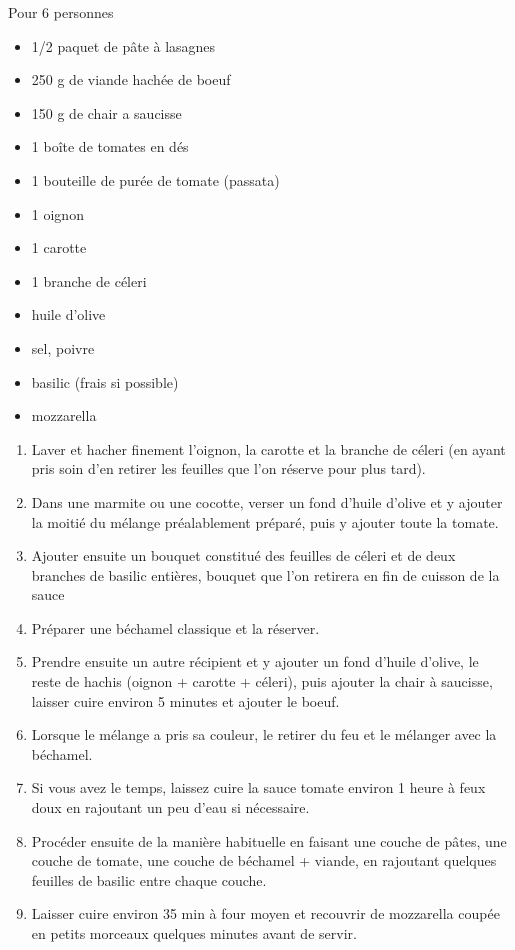 \bigskip
{}
{Pour 6 personnes}{\begin{itemize}
	\item 1/2 paquet de pâte à lasagnes
	\item 250 g de viande hachée de boeuf
	\item 150 g de chair a saucisse
	\item 1 boîte de tomates en dés
	\item 1 bouteille de purée de tomate (passata)
	\item 1 oignon
	\item 1 carotte
	\item 1 branche de céleri
	\item huile d'olive
	\item sel, poivre
	\item basilic (frais si possible)
	\item mozzarella
\end{itemize}}
{\begin{enumerate}
	\item Laver et hacher finement l'oignon, la carotte et la branche de céleri (en ayant pris soin d'en retirer les feuilles que l'on réserve pour plus tard).
	\item Dans une marmite ou une cocotte, verser un fond d'huile d'olive et y ajouter la moitié du mélange préalablement préparé, puis y ajouter toute la tomate.
	\item Ajouter ensuite un bouquet constitué des feuilles de céleri et de deux branches de basilic entières, bouquet que l'on retirera en fin de cuisson de la sauce
	\item Préparer une béchamel classique et la réserver.
	\item Prendre ensuite un autre récipient et y ajouter un fond d'huile d'olive, le reste de hachis (oignon + carotte + céleri), puis ajouter la chair à saucisse, laisser cuire environ 5 minutes et ajouter le boeuf.
	\item Lorsque le mélange a pris sa couleur, le retirer du feu et le mélanger avec la béchamel.
	\item Si vous avez le temps, laissez cuire la sauce tomate environ 1 heure à feux doux en rajoutant un peu d'eau si nécessaire.
	\item Procéder ensuite de la manière habituelle en faisant une couche de pâtes, une couche de tomate, une couche de béchamel + viande, en rajoutant quelques feuilles de basilic entre chaque couche.
	\item Laisser cuire environ 35 min à four moyen et recouvrir de mozzarella coupée en petits morceaux quelques minutes avant de servir.
\end{enumerate}}

